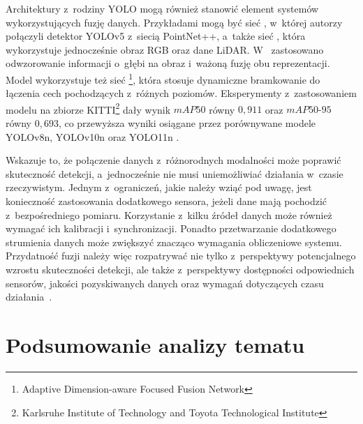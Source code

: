 Architektury z~rodziny YOLO mogą również stanowić element systemów wykorzystujących fuzję danych. Przykładami mogą być sieć , w~której autorzy połączyli detektor YOLOv5 z~siecią PointNet++, a~także sieć , która wykorzystuje jednocześnie obraz RGB oraz dane LiDAR. W~ zastosowano odwzorowanie informacji o~głębi na obraz i~ważoną fuzję obu reprezentacji. Model wykorzystuje też sieć \footnote{Adaptive Dimension-aware Focused Fusion Network}, która stosuje dynamiczne bramkowanie do łączenia cech pochodzących z~różnych poziomów. Eksperymenty z~zastosowaniem modelu  na zbiorze KITTI\footnote{Karlsruhe Institute of Technology and Toyota Technological Institute} dały wynik $mAP50$ równy $0,911$ oraz $mAP50\text{-}95$ równy $0,693$, co przewyższa wyniki osiągane przez porównywane modele YOLOv8n, YOLOv10n oraz YOLO11n \cite{bib:ma2024yolopoint,bib:xu2025dtcyolo}.

Wskazuje to, że połączenie danych z~różnorodnych modalności może poprawić skuteczność detekcji, a~jednocześnie nie musi uniemożliwiać działania w~czasie rzeczywistym. Jednym z~ograniczeń, jakie należy wziąć pod uwagę, jest konieczność zastosowania dodatkowego sensora, jeżeli dane mają pochodzić z~bezpośredniego pomiaru. Korzystanie z~kilku źródeł danych może również wymagać ich kalibracji i~synchronizacji. Ponadto przetwarzanie dodatkowego strumienia danych może zwiększyć znacząco wymagania obliczeniowe systemu. Przydatność fuzji należy więc rozpatrywać nie tylko z~perspektywy potencjalnego wzrostu skuteczności detekcji, ale także z~perspektywy dostępności odpowiednich sensorów, jakości pozyskiwanych danych oraz wymagań dotyczących czasu działania~.

\section{Podsumowanie analizy tematu}


